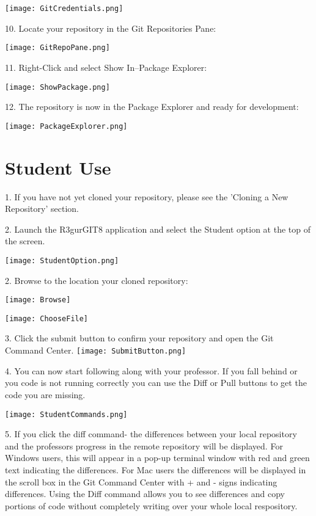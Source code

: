 \documentclass{article}
\begin{document}
\texttt{[image: GitCredentials.png]}

10. Locate your repository in the Git Repositories Pane:

\texttt{[image: GitRepoPane.png]}

11. Right-Click and select Show In--Package Explorer:

\texttt{[image: ShowPackage.png]}

12. The repository is now in the Package Explorer and ready for development:

\texttt{[image: PackageExplorer.png]}

\newpage

\section{Student Use}

1. If you have not yet cloned your repository, please see the 'Cloning a New Repository' section.

2. Launch the R3gurGIT8 application and select the Student option at the top of the screen.

\texttt{[image: StudentOption.png]}

2. Browse to the location your cloned repository:

\texttt{[image: Browse]}

\texttt{[image: ChooseFile]}

3. Click the submit button to confirm your repository and open the Git Command Center.
\texttt{[image: SubmitButton.png]}

4.  You can now start following along with your professor.  If you fall behind or you code is not running correctly you can use the Diff or Pull buttons to get the code you are missing.

\texttt{[image: StudentCommands.png]}

5.  If you click the diff command- the differences between your local repository and the professors progress in the remote repository will be displayed.  For Windows users, this will appear in a pop-up terminal window with red and green text indicating the differences.  For Mac users the differences will be displayed in the scroll box in the Git Command Center with + and - signs indicating differences.  Using the Diff command allows you to see differences and copy portions of code without completely writing over your whole local respository.
\end{document}
